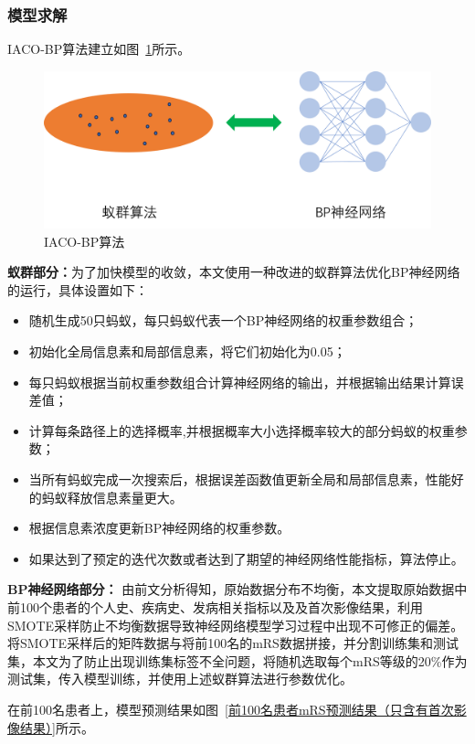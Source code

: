 \documentclass[bwprint]{gmcmthesis}
\begin{document}
\subsubsection{模型求解}
IACO-BP算法建立如图~\ref{IACO算法}所示。

\begin{figure}[h] %
  \centering %
  \includegraphics[width=.7\textwidth]{fig_me/蚁群神经网络.png}
  \caption{IACO-BP算法}
  \label{IACO算法}
\end{figure}

\textbf{蚁群部分：}为了加快模型的收敛，本文使用一种改进的蚁群算法优化BP神经网络的运行，具体设置如下：
\begin{itemize}
    \item 随机生成50只蚂蚁，每只蚂蚁代表一个BP神经网络的权重参数组合；
    \item 初始化全局信息素和局部信息素，将它们初始化为0.05；
    \item 每只蚂蚁根据当前权重参数组合计算神经网络的输出，并根据输出结果计算误差值；
    \item 计算每条路径上的选择概率,并根据概率大小选择概率较大的部分蚂蚁的权重参数；
    \item 当所有蚂蚁完成一次搜索后，根据误差函数值更新全局和局部信息素，性能好的蚂蚁释放信息素量更大。
    \item 根据信息素浓度更新BP神经网络的权重参数。
    \item 如果达到了预定的迭代次数或者达到了期望的神经网络性能指标，算法停止。
    
\end{itemize}

\textbf{BP神经网络部分：}
由前文分析得知，原始数据分布不均衡，本文提取原始数据中前100个患者的个人史、疾病史、发病相关指标以及及首次影像结果，利用SMOTE采样防止不均衡数据导致神经网络模型学习过程中出现不可修正的偏差。将SMOTE采样后的矩阵数据与将前100名的mRS数据拼接，并分割训练集和测试集，本文为了防止出现训练集标签不全问题，将随机选取每个mRS等级的20\%作为测试集，传入模型训练，并使用上述蚁群算法进行参数优化。

在前100名患者上，模型预测结果如图~\ref{前100名患者mRS预测结果（只含有首次影像结果）}所示。
\end{document}
